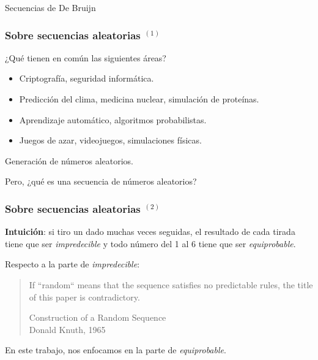 \documentclass[t, 10pt, mathserif]{beamer}
\begin{document}
\begin{frame}{Secuencias de De Bruijn}

\end{frame}


\begin{frame}
  \frametitle{Sobre secuencias aleatorias {$^{(1)}$}}

  ¿Qué tienen en común las siguientes áreas?
  \pause

  \begin{itemize}
    \item Criptografía, seguridad informática.\pause
    \item Predicción del clima, medicina nuclear, simulación de proteínas.\pause
    \item Aprendizaje automático, algoritmos probabilistas.\pause
    \item Juegos de azar, videojuegos, simulaciones físicas.
  \end{itemize}
  \pause

  {\color{cyan} Generación de números aleatorios.}
  \pause

  Pero, ¿qué es una secuencia de números aleatorios?
\end{frame}


\begin{frame}
  \frametitle{Sobre secuencias aleatorias {$^{(2)}$}}

  \textbf{Intuición}: si tiro un dado muchas veces seguidas, el resultado de cada tirada tiene que ser \textit{impredecible} y todo número del 1 al 6 tiene que ser \textit{equiprobable}.
  \pause

  Respecto a la parte de \textit{impredecible}:
  \begin{quote}
    If ``random`` means that the sequence satisfies no predictable rules, the title of this paper is contradictory.
    \begin{flushright}
      \small{Construction of a Random Sequence \\}
      \small{Donald Knuth, 1965}
    \end{flushright}
  \end{quote}
  \pause

  En este trabajo, nos enfocamos en la parte de \textit{equiprobable}.
\end{frame}
\end{document}
